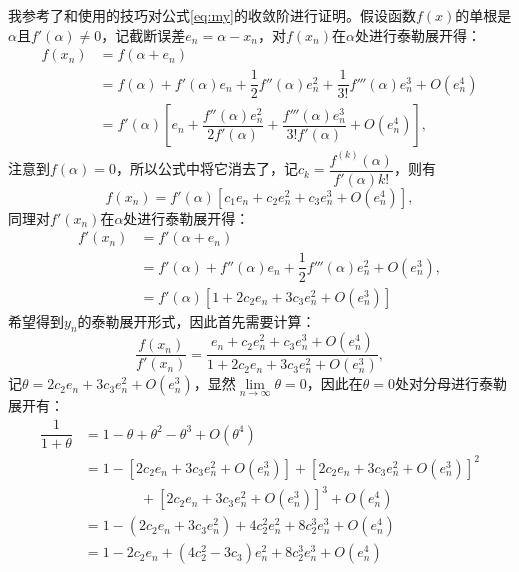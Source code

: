 我参考了\cite{kou2006modified}和\cite{eftekhari2014new}使用的技巧对公式\ref{eq:my}的收敛阶进行证明。假设函数$f(x)$的单根是$\alpha$且$f'(\alpha)\neq 0$，记截断误差$e_n = \alpha - x_n$，对$f(x_n)$在$\alpha$处进行泰勒展开得：
\begin{equation}
    \label{eq:fx-taylor}
    \begin{aligned}
        f(x_n) &= f(\alpha + e_n) \\
        &= f(\alpha) + f'(\alpha)e_n + \dfrac{1}{2}f''(\alpha)e_n^2+\dfrac{1}{3!}f'''(\alpha)e_n^3+O(e_n^4) \\
        &= f'(\alpha)\left[e_n + \dfrac{f''(\alpha)e_n^2}{2f'(\alpha)}+\dfrac{f'''(\alpha)e_n^3}{3!f'(\alpha)} + O(e_n^4) \right],
    \end{aligned}
\end{equation}
注意到$f(\alpha)=0$，所以公式中将它消去了，记$c_k=\dfrac{f^{(k)}(\alpha)}{f'(\alpha)k!}$，则有
\begin{equation}
    f(x_n) = f'(\alpha)\left[c_1e_n + c_2e_n^2 + c_3e_n^3 + O(e_n^4)\right],
\end{equation}
同理对$f'(x_n)$在$\alpha$处进行泰勒展开得：
\begin{equation}
    \label{eq:dx}
    \begin{aligned}
        f'(x_n) &= f'(\alpha + e_n)\\
        &= f'(\alpha) + f''(\alpha)e_n + \dfrac{1}{2}f'''(\alpha)e_n^2 + O(e_n^3), \\
        &=f'(\alpha) [1 + 2c_2e_n + 3c_3e_n^2 + O(e_n^3)]
    \end{aligned}
\end{equation}
希望得到$y_n$的泰勒展开形式，因此首先需要计算：
\begin{equation}
    \label{eq:fx-div-dx}
    \dfrac{f(x_n)}{f'(x_n)} = \dfrac{e_n+c_2e_n^2 + c_3e_n^3 + O(e_n^4)}{1 + 2c_2e_n + 3c_3e_n^2 + O(e_n^3)},
\end{equation}
记$\theta = 2c_2e_n + 3c_3e_n^2 + O(e_n^3)$，显然$\lim\limits_{n\to \infty}\theta = 0$，因此在$\theta = 0$处对分母进行泰勒展开有：
\begin{equation}
    \label{eq:fenmu-taylor}
    \begin{aligned}
        \dfrac{1}{1+\theta} &= 1 - \theta + \theta^2 - \theta^3 + O(\theta^4) \\
        &= 1 - [2c_2e_n + 3c_3e_n^2 + O(e_n^3)] + [2c_2e_n + 3c_3e_n^2 + O(e_n^3)]^2 \\
        &\qquad\qquad + [2c_2e_n + 3c_3e_n^2 + O(e_n^3)]^3 + O(e_n^4)\\
        &= 1 - (2c_2e_n + 3c_3e_n^2) + 4c_2^2e_n^2 + 8c_2^3e_n^3 + O(e_n^4)\\
        &= 1 - 2c_2e_n + (4c_2^2 - 3c_3)e_n^2 + 8c_2^3e_n^3 + O(e_n^4)
    \end{aligned}
\end{equation}
